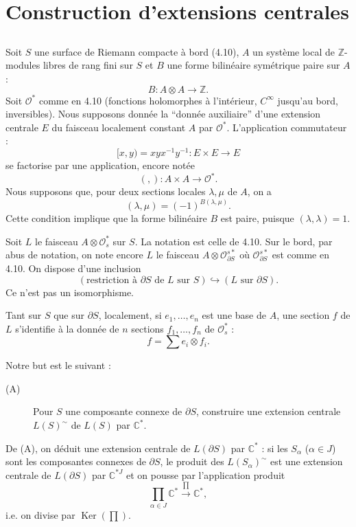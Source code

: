 \documentclass[12pt,a4paper]{article}
\theoremstyle{plain}
\theoremstyle{definition}
\theoremstyle{remark}
\DeclareMathOperator{\Ker}{Ker}
\newcommand{\cO}{\mathcal{O}}
\newcommand{\Z}{\mathbb{Z}}
\newcommand{\C}{\mathbb{C}}
\providecommand{\cO}{\mathcal{O}}
\providecommand{\Ker}{\operatorname{Ker}}
\begin{document}
\section{Construction d'extensions centrales}

\subsection{}

Soit $S$ une surface de Riemann compacte à bord (4.10), $A$ un système local
de $\Z$-modules libres de rang fini sur $S$ et $B$ une forme bilinéaire symétrique paire sur $A$ :
\[
B : A \otimes A \to \Z.
\]
Soit $\cO^*$ comme en 4.10 (fonctions holomorphes à l'intérieur, $C^\infty$ jusqu'au bord,
inversibles). Nous supposons donnée la ``donnée auxiliaire'' d'une extension centrale $E$
du faisceau localement constant $A$ par $\cO^*$. L'application commutateur :
\[
[x, y) = xyx^{-1}y^{-1} : E \times E \to E
\]
se factorise par une application, encore notée
\[
(,) : A \times A \to \cO^*.
\]
Nous supposons que, pour deux sections locales $\lambda, \mu$ de $A$, on a
\begin{equation}\label{eq:5.1.1}
(\lambda, \mu) = (-1)^{B(\lambda, \mu)}.
\end{equation}
Cette condition implique que la forme bilinéaire $B$ est paire, puisque $(\lambda, \lambda) = 1$.

Soit $L$ le faisceau $A \otimes \cO_s^*$ sur $S$. La notation est celle de 4.10. Sur le bord, par abus
de notation, on note encore $L$ le faisceau $A \otimes \cO_{\partial S}^{s*}$ où $\cO_{\partial S}^{s*}$ est comme en 4.10. On dispose
d'une inclusion
\[
(\text{restriction à } \partial S \text{ de } L \text{ sur } S) \hookrightarrow (L \text{ sur } \partial S).
\]
Ce n'est pas un isomorphisme.

Tant sur $S$ que sur $\partial S$, localement, si $e_1, \ldots, e_n$ est une base de $A$, une section $f$
de $L$ s'identifie à la donnée de $n$ sections $f_1, \ldots, f_n$ de $\cO_s^*$ :
\[
f = \sum e_i \otimes f_i.
\]

Notre but est le suivant :

\begin{description}
\item[(A)] Pour $S$ une composante connexe de $\partial S$, construire une extension centrale $L(S)^\sim$
de $L(S)$ par $\C^*$.
\end{description}

De (A), on déduit une extension centrale de $L(\partial S)$ par $\C^*$ : si les $S_\alpha$ ($\alpha \in J$) sont les
composantes connexes de $\partial S$, le produit des $L(S_\alpha)^\sim$ est une extension centrale de $L(\partial S)$
par $\C^{*J}$ et on pousse par l'application produit
\[
\prod_{\alpha \in J} \C^* \xrightarrow{\prod} \C^*,
\]
i.e. on divise par $\Ker(\prod)$.
\end{document}
